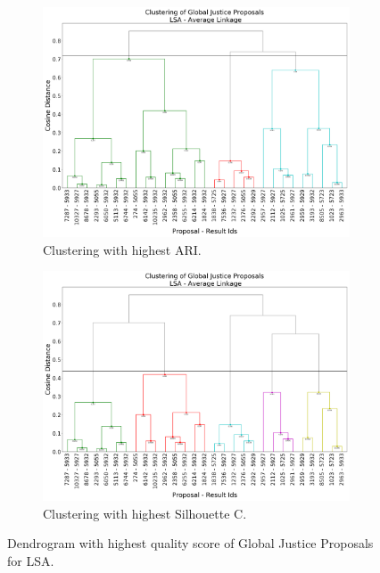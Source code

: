 \begin{figure}[!htpb]
  \centering
  \begin{subfigure}[b]{0.48\textwidth}   
  \centering 
  \includegraphics[width=\textwidth]{lsa/BEST_ARI_Global_Justice.png}
  \caption[]%
  {{\small Clustering with highest ARI.}}    
  \label{fig:gj.lsa.ari}
  \end{subfigure}
  \quad
  \begin{subfigure}[b]{0.48\textwidth}   
  \centering 
  \includegraphics[width=\textwidth]{lsa/BEST_SIL_Global_Justice.png}
  \caption[]%
  {{\small Clustering with highest Silhouette C.}}    
  \label{fig:gj.lsa.sil}
  \end{subfigure}
\caption{Dendrogram with highest quality score of Global Justice Proposals for LSA.}
\label{fig:gj.lsa.dendro}
\end{figure}

